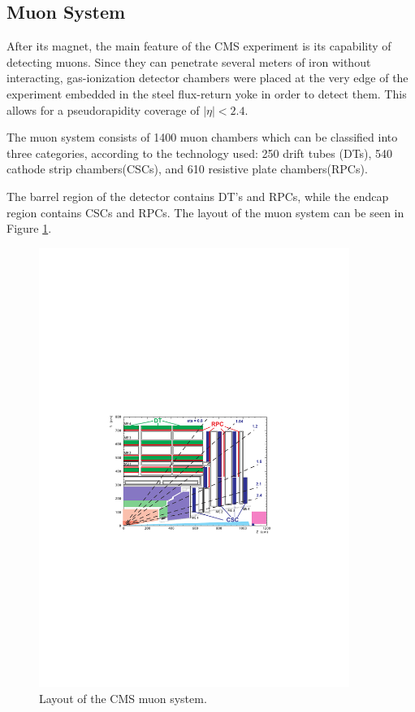  \subsection{Muon System}
 After its magnet, the main feature of the CMS experiment is its capability of detecting muons. Since they can penetrate several meters of iron without interacting, gas-ionization detector chambers were placed at the very edge of the experiment embedded in the steel flux-return yoke in order to detect them. This allows for a pseudorapidity coverage of $|\eta| < 2.4$.

 The muon system consists of 1400 muon chambers which can be classified into three categories, according to the technology used: 250 drift tubes (DTs), 540 cathode strip chambers(CSCs), and 610 resistive plate chambers(RPCs).

 The barrel region of the detector contains DT's and RPCs, while the endcap region contains CSCs and RPCs. The layout of the muon system can be seen in Figure \ref{fig:cmsmuonsys}. 

    \begin{figure}[h]
 	\centering
 	\includegraphics[width=0.9\textwidth]{figures/CMS_muon_system.pdf}
 	\singlespace
 	\caption{Layout of the CMS muon system.}
 	\label{fig:cmsmuonsys}
	\end{figure}

